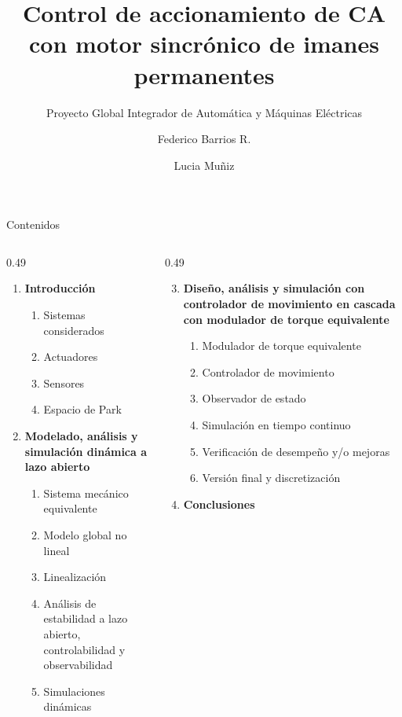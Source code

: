 \documentclass{beamer}
\title[Control de un brazo con PMSM]{Control de accionamiento de CA con motor sincrónico de imanes permanentes}
\subtitle{Proyecto Global Integrador de Automática y Máquinas Eléctricas}
\author[Barrios y Muñiz]{Federico Barrios R. \and Lucia Muñiz}
\institute[UNCuyo]{Ingeniería Mecatrónica\\Facultad de Ingeniería, Universidad Nacional de Cuyo}
\date{} %
\begin{document}
\begin{frame}
  \titlepage
\end{frame}

\begin{frame}[t]{Contenidos}
  \small
  \begin{columns}[T,onlytextwidth]
    \begin{column}{0.49\textwidth}
      \begin{enumerate}
        \item \textbf{Introducción}
          \begin{enumerate}
            \item Sistemas considerados
            \item Actuadores
            \item Sensores
            \item Espacio de Park
          \end{enumerate}
        \item \textbf{Modelado, análisis y simulación dinámica a lazo abierto}
          \begin{enumerate}
            \item Sistema mecánico equivalente
            \item Modelo global no lineal
            \item Linealización
            \item Análisis de estabilidad a lazo abierto, controlabilidad y observabilidad
            \item Simulaciones dinámicas
          \end{enumerate}
      \end{enumerate}
    \end{column}
    \begin{column}{0.49\textwidth}
      \begin{enumerate}
        \setcounter{enumi}{2}
        \item \textbf{Diseño, análisis y simulación con controlador de movimiento en cascada con modulador de torque equivalente}
          \begin{enumerate}
            \item Modulador de torque equivalente
            \item Controlador de movimiento
            \item Observador de estado
            \item Simulación en tiempo continuo
            \item Verificación de desempeño y/o mejoras
            \item Versión final y discretización
          \end{enumerate}
        \item \textbf{Conclusiones}
      \end{enumerate}
    \end{column}
  \end{columns}
\end{frame}
\end{document}
